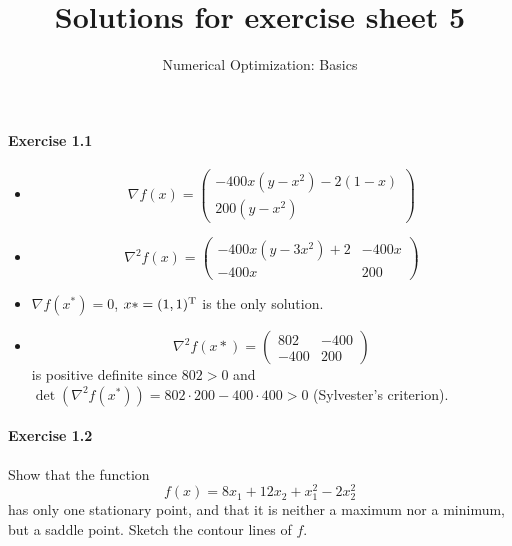 
\title{Solutions for exercise sheet 5}
\subtitle{Numerical Optimization: Basics}
\usepackage{amsmath}
\newcommand\tp{\ensuremath{\text{\upshape T}}}

\maketitle

\paragraph{Exercise 1.1} %
\begin{itemize}
\item \[
\nabla f(x) =
\begin{pmatrix}
-400 x(y-x^2)-2(1-x)\\
200(y-x^2)
\end{pmatrix}
\]
\item \[
\nabla^2 f(x) =
\begin{pmatrix}
-400x (y-3x^2) + 2 & -400x\\
-400x              & 200
\end{pmatrix}
\]
\item $\nabla f(x^*) = 0$, $x*=(1,1)^\tp$ is the only solution.
\item
\[
\nabla^2 f(x*) =
\begin{pmatrix}
802 & -400\\
-400 & 200
\end{pmatrix}
\]
is positive definite since $802>0$ and $\det(\nabla^2 f(x^*)) = 802\cdot200 - 400\cdot 400 > 0$ (Sylvester's criterion).
\end{itemize}


\paragraph{Exercise 1.2} %
Show that the function
\[
  f(x) = 8x_1 + 12x_2 + x_1^2 - 2x_2^2
\]
has only one stationary point, and that it is neither a maximum nor a minimum,
but a saddle point. Sketch the contour lines of $f$.

